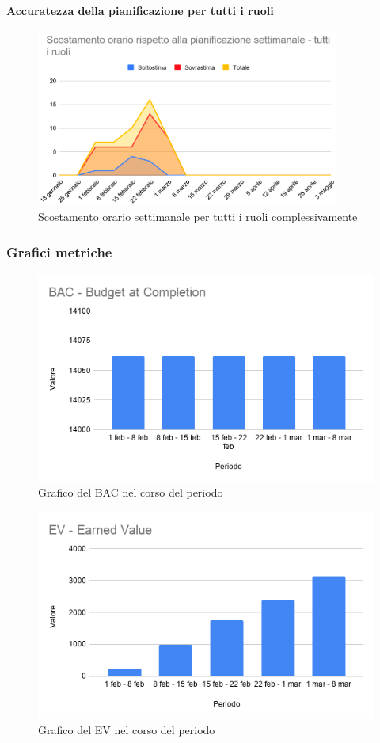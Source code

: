 \paragraph{Accuratezza della pianificazione per tutti i ruoli}
\begin{figure}[H]
	\centering
	\includegraphics[width=10cm]{res/images/tutti}
	\caption{Scostamento orario settimanale per tutti i ruoli complessivamente}
	\label{fig:Scostamento orario settimanale per tutti i ruoli complessivamente}
\end{figure}

\subsubsection{Grafici metriche}
	\begin{figure}[H]
	\centering
	\includegraphics[width=0.7\linewidth]{res/images/BAC.png}
	\caption{Grafico del BAC nel corso del periodo}
	\label{fig:Figura1}
\end{figure}

\begin{figure}[H]
	\centering
	\includegraphics[width=0.7\linewidth]{res/images/EV.png}
	\caption{Grafico del EV nel corso del periodo}
	\label{fig:Figura2}
\end{figure}

